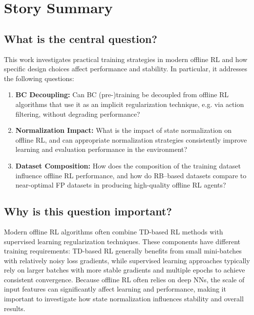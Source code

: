 \cleardoubleoddpage
\chapter{Story Summary}
\label{app:story-summary}


\section{What is the central question?}
\label{app:what-is-the-central-question}

This work investigates practical training strategies in modern offline RL and how specific design choices affect performance and stability. In particular, it addresses the following questions:

\begin{enumerate}
    \item \textbf{BC Decoupling:} Can BC (pre-)training be decoupled from offline RL algorithms that use it as an implicit regularization technique, e.g. via action filtering, without degrading performance?

    \item \textbf{Normalization Impact:} What is the impact of state normalization on offline RL, and can appropriate normalization strategies consistently improve learning and evaluation performance in the environment?

    \item \textbf{Dataset Composition:} How does the composition of the training dataset influence offline RL performance, and how do RB–based datasets compare to near-optimal FP datasets in producing high-quality offline RL agents?
\end{enumerate}


\section{Why is this question important?}
Modern offline RL algorithms often combine TD-based RL methods with supervised learning regularization techniques. These components have different training requirements: TD-based RL generally benefits from small mini-batches with relatively noisy loss gradients, while supervised learning approaches typically rely on larger batches with more stable gradients and multiple epochs to achieve consistent convergence. Because offline RL often relies on deep NNs, the scale of input features can significantly affect learning and performance, making it important to investigate how state normalization influences stability and overall results.




